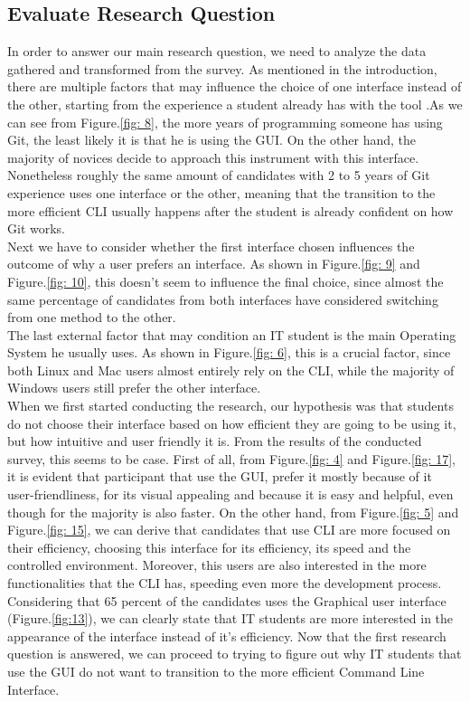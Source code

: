 \documentclass[]{report}
\begin{document}
	\subsection{Evaluate Research Question}
	In order to answer our main research question, we need to analyze the data gathered and transformed from the survey.
	As mentioned in the introduction, there are multiple factors that may influence the choice of one interface instead of the other, starting from the experience a student already has with the tool .As we can see from Figure.\ref{fig: 8}, the more years of programming someone has using Git, the least likely it is that he is using the GUI. On the other hand, the majority of novices decide to approach this instrument with this interface. Nonetheless roughly the same amount of candidates with 2 to 5 years of Git experience uses one interface or the other, meaning that the transition to the more efficient CLI usually happens after the student is already confident on how Git works.\\
	Next we have to consider whether the first interface chosen influences the outcome of why a user prefers an interface. As shown in Figure.\ref{fig: 9} and Figure.\ref{fig: 10}, this doesn't seem to  influence the final choice, since almost the same percentage of candidates from both interfaces have considered switching from one method to the other.\\
	The last external factor that may condition an IT student is the main Operating System he usually uses. As shown in Figure.\ref{fig: 6}, this is a crucial factor, since both Linux and Mac users almost entirely rely on the CLI, while the majority of Windows users still prefer the other interface.\\
	When we first started conducting the research, our hypothesis was that students do not choose their interface based on how efficient they are going to be using it, but how intuitive and user friendly it is.
	From the results of the conducted survey, this seems to be case.
	First of all, from Figure.\ref{fig: 4} and Figure.\ref{fig: 17}, it is evident that participant that use the GUI, prefer it mostly because of it user-friendliness, for its visual appealing and because it is easy and helpful, even though for the majority is also faster.
	On the other hand, from Figure.\ref{fig: 5} and Figure.\ref{fig: 15}, we can derive that candidates that use CLI are more focused on their efficiency, choosing this interface for its efficiency, its speed and the controlled environment. Moreover, this users are also interested in the more functionalities that the CLI has, speeding even more the development process.
	Considering that 65  percent of the candidates uses the Graphical user interface (Figure.\ref{fig:13}), we can clearly state that IT students are more interested in the appearance of the interface instead of it's efficiency.
	Now that the first research question is answered, we can proceed to trying to figure out why IT students that use the GUI do not want to transition to the more efficient Command Line Interface.
\end{document}
